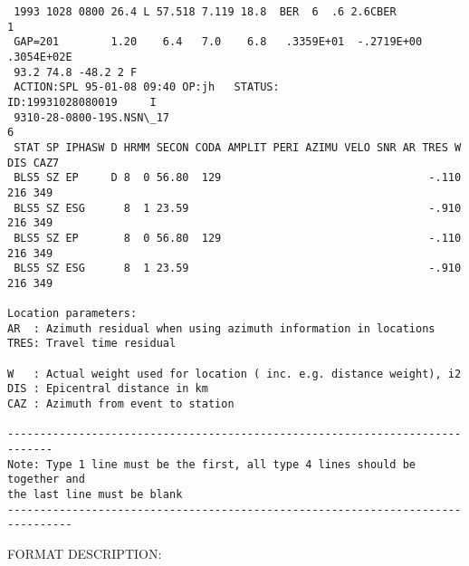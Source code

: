 \begin{verbatim}
 1993 1028 0800 26.4 L 57.518 7.119 18.8  BER  6  .6 2.6CBER                   1
 GAP=201        1.20    6.4   7.0    6.8   .3359E+01  -.2719E+00      .3054E+02E 
 93.2 74.8 -48.2 2 F
 ACTION:SPL 95-01-08 09:40 OP:jh   STATUS:               ID:19931028080019     I
 9310-28-0800-19S.NSN\_17                                                      6
 STAT SP IPHASW D HRMM SECON CODA AMPLIT PERI AZIMU VELO SNR AR TRES W DIS CAZ7
 BLS5 SZ EP     D 8  0 56.80  129                                -.110 216 349
 BLS5 SZ ESG      8  1 23.59                                     -.910 216 349
 BLS5 SZ EP       8  0 56.80  129                                -.110 216 349
 BLS5 SZ ESG      8  1 23.59                                     -.910 216 349 

Location parameters:
AR  : Azimuth residual when using azimuth information in locations
TRES: Travel time residual 

W   : Actual weight used for location ( inc. e.g. distance weight), i2
DIS : Epicentral distance in km
CAZ : Azimuth from event to station 

-----------------------------------------------------------------------------
Note: Type 1 line must be the first, all type 4 lines should be together and
the last line must be blank 
--------------------------------------------------------------------------------

\end{verbatim}
 FORMAT DESCRIPTION: 
